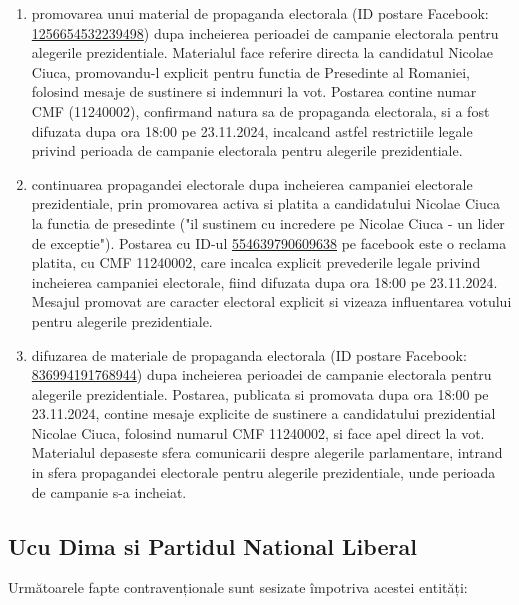 \documentclass[a4paper,12pt]{article}
\begin{document}
\begin{enumerate}[leftmargin=*, label=\arabic*.)]
    \item promovarea unui material de propaganda electorala (ID postare Facebook: \href{https://www.facebook.com/ads/library/?id=1256654532239498}{1256654532239498}) dupa incheierea perioadei de campanie electorala pentru alegerile prezidentiale. Materialul face referire directa la candidatul Nicolae Ciuca, promovandu-l explicit pentru functia de Presedinte al Romaniei, folosind mesaje de sustinere si indemnuri la vot. Postarea contine numar CMF (11240002), confirmand natura sa de propaganda electorala, si a fost difuzata dupa ora 18:00 pe 23.11.2024, incalcand astfel restrictiile legale privind perioada de campanie electorala pentru alegerile prezidentiale.
    \item continuarea propagandei electorale dupa incheierea campaniei electorale prezidentiale, prin promovarea activa si platita a candidatului Nicolae Ciuca la functia de presedinte ("il sustinem cu incredere pe Nicolae Ciuca - un lider de exceptie"). Postarea cu ID-ul \href{https://www.facebook.com/ads/library/?id=554639790609638}{554639790609638} pe facebook este o reclama platita, cu CMF 11240002, care incalca explicit prevederile legale privind incheierea campaniei electorale, fiind difuzata dupa ora 18:00 pe 23.11.2024. Mesajul promovat are caracter electoral explicit si vizeaza influentarea votului pentru alegerile prezidentiale.
    \item difuzarea de materiale de propaganda electorala (ID postare Facebook: \href{https://www.facebook.com/ads/library/?id=836994191768944}{836994191768944}) dupa incheierea perioadei de campanie electorala pentru alegerile prezidentiale. Postarea, publicata si promovata dupa ora 18:00 pe 23.11.2024, contine mesaje explicite de sustinere a candidatului prezidential Nicolae Ciuca, folosind numarul CMF 11240002, si face apel direct la vot. Materialul depaseste sfera comunicarii despre alegerile parlamentare, intrand in sfera propagandei electorale pentru alegerile prezidentiale, unde perioada de campanie s-a incheiat.
\end{enumerate}

\vspace{0.5cm}

\subsection{Ucu Dima si Partidul National Liberal}
Următoarele fapte contravenționale sunt sesizate împotriva acestei entități:
\end{document}
